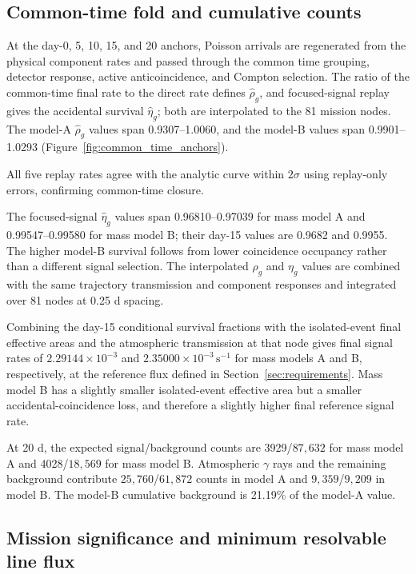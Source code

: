 \documentclass[11pt]{article}
\newcommand{\cps}{\ensuremath{\,\mathrm{s^{-1}}}}
\begin{document}
\FloatBarrier

\subsection{Common-time fold and cumulative counts}
\label{subsec:mission_fold_validation}

At the day-0, 5, 10, 15, and 20 anchors, Poisson arrivals are regenerated from the physical component rates and passed through the common time grouping, detector response, active anticoincidence, and Compton selection. The ratio of the common-time final rate to the direct rate defines $\widehat\rho_g$, and focused-signal replay gives the accidental survival $\widehat\eta_g$; both are interpolated to the 81 mission nodes. The model-A $\widehat\rho_g$ values span 0.9307--1.0060, and the model-B values span 0.9901--1.0293 (Figure~\ref{fig:common_time_anchors}).

All five replay rates agree with the analytic curve within $2\sigma$ using
replay-only errors, confirming common-time closure.

The focused-signal $\widehat\eta_g$ values span 0.96810--0.97039 for mass model A and 0.99547--0.99580 for mass model B; their day-15 values are 0.9682 and 0.9955. The higher model-B survival follows from lower coincidence occupancy rather than a different signal selection. The interpolated $\rho_g$ and $\eta_g$ values are combined with the same trajectory transmission and component responses and integrated over 81 nodes at 0.25 d spacing.

Combining the day-15 conditional survival fractions with the isolated-event final effective areas and the atmospheric transmission at that node gives final signal rates of $2.29144\times10^{-3}$ and $2.35000\times10^{-3}\cps$ for mass models A and B, respectively, at the reference flux defined in Section~\ref{sec:requirements}. Mass model B has a slightly smaller isolated-event effective area but a smaller accidental-coincidence loss, and therefore a slightly higher final reference signal rate.

At 20 d, the expected signal/background counts are 3929/$87{,}632$ for mass
model A and 4028/$18{,}569$ for mass model B. Atmospheric $\gamma$ rays and the
remaining background contribute $25{,}760$/$61{,}872$ counts in model A and
$9{,}359$/$9{,}209$ in model B. The model-B cumulative background is 21.19\%
of the model-A value.

\subsection{Mission significance and minimum resolvable line flux}
\label{subsec:final_mission_performance}
\end{document}
